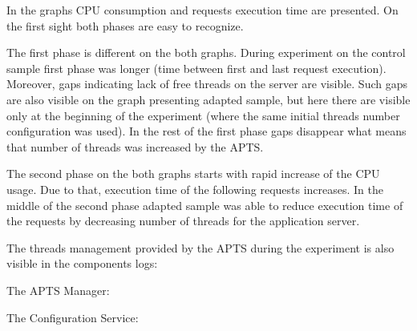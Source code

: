\documentclass[12pt,a4paper]{article}
\begin{document}
In the graphs CPU consumption and requests execution time are presented. On the first sight both phases are easy to recognize.

The first phase is different on the both graphs. During experiment on the control sample first phase was longer (time between first and last request execution). Moreover, gaps indicating lack of free threads on the server are visible. Such gaps are also visible on the graph presenting adapted sample, but here there are visible only at the beginning of the experiment (where the same initial threads number configuration was used). In the rest of the first phase gaps disappear what means that number of threads was increased by the APTS. 

The second phase on the both graphs starts with rapid increase of the CPU usage. Due to that, execution time of the following requests increases. In the middle of the second phase adapted sample was able to reduce execution time of the requests by decreasing number of threads for the application server.  

The threads management provided by the APTS during the experiment is also visible in the components logs:

The APTS Manager:

\noindent{}\vspace{1mm}

The Configuration Service:

\vspace{1mm}\noindent{}\vspace{1mm}
\end{document}
